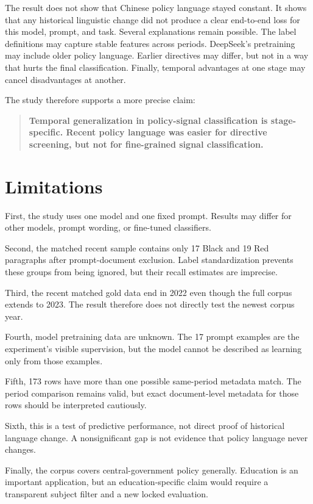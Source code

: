 \documentclass[11pt]{article}
\begin{document}
The result does not show that Chinese policy language stayed constant. It shows that any historical linguistic change did not produce a clear end-to-end loss for this model, prompt, and task. Several explanations remain possible. The label definitions may capture stable features across periods. DeepSeek's pretraining may include older policy language. Earlier directives may differ, but not in a way that hurts the final classification. Finally, temporal advantages at one stage may cancel disadvantages at another.

The study therefore supports a more precise claim:

\begin{quote}
\textbf{Temporal generalization in policy-signal classification is stage-specific. Recent policy language was easier for directive screening, but not for fine-grained signal classification.}
\end{quote}

\section{Limitations}

First, the study uses one model and one fixed prompt. Results may differ for other models, prompt wording, or fine-tuned classifiers.

Second, the matched recent sample contains only 17 Black and 19 Red paragraphs after prompt-document exclusion. Label standardization prevents these groups from being ignored, but their recall estimates are imprecise.

Third, the recent matched gold data end in 2022 even though the full corpus extends to 2023. The result therefore does not directly test the newest corpus year.

Fourth, model pretraining data are unknown. The 17 prompt examples are the experiment's visible supervision, but the model cannot be described as learning only from those examples.

Fifth, 173 rows have more than one possible same-period metadata match. The period comparison remains valid, but exact document-level metadata for those rows should be interpreted cautiously.

Sixth, this is a test of predictive performance, not direct proof of historical language change. A nonsignificant gap is not evidence that policy language never changes.

Finally, the corpus covers central-government policy generally. Education is an important application, but an education-specific claim would require a transparent subject filter and a new locked evaluation.
\end{document}
